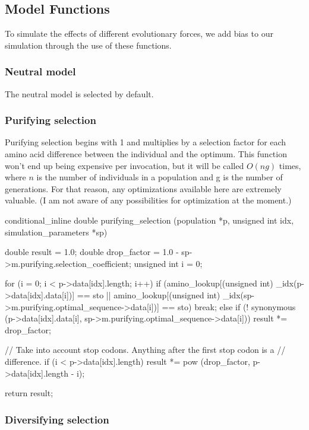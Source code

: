 \documentclass{article}
\begin{document}
    \subsection{Model Functions}

      To simulate the effects of different evolutionary forces, we add bias to
      our simulation through the use of these functions.

      \subsubsection{Neutral model}

	The neutral model is selected by default.

      \subsubsection{Purifying selection}

	Purifying selection begins with 1 and multiplies by a selection factor
	for each amino acid difference between the individual and the optimum.
	This function won't end up being expensive per invocation, but it will
	be called $O(ng)$ times, where $n$ is the number of individuals in a
	population and g is the number of generations. For that reason, any
	optimizations available here are extremely valuable. (I am not aware of
	any possibilities for optimization at the moment.)

\begin{ccode}
conditional_inline double purifying_selection (population *p, unsigned int idx, simulation_parameters *sp) {
  double	result          = 1.0;
  double	drop_factor     = 1.0 - sp->m.purifying.selection_coefficient;
  unsigned int	i            	= 0;

  for (i = 0; i < p->data[idx].length; i++)
    if (amino_lookup[(unsigned int) _idx(p->data[idx].data[i])] == sto ||
	amino_lookup[(unsigned int) _idx(sp->m.purifying.optimal_sequence->data[i])] == sto)
      break;
    else if (! synonymous (p->data[idx].data[i], sp->m.purifying.optimal_sequence->data[i]))
      result *= drop_factor;

  // Take into account stop codons. Anything after the first stop codon is a
  // difference.
  if (i < p->data[idx].length)
    result *= pow (drop_factor, p->data[idx].length - i);

  return result;
}
\end{ccode}

      \subsubsection{Diversifying selection}
\end{document}
